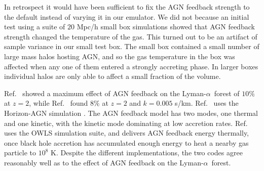 \documentclass[a4paper,11pt]{article}
\newcommand{\Lya}{Lyman-$\alpha$}
\begin{document}
In retrospect it would have been sufficient to fix the AGN feedback strength to the default instead of varying it in our emulator. We did not because an initial test using a suite of $20$ Mpc/h small box simulations showed that AGN feedback strength changed the temperature of the gas. This turned out to be an artifact of sample variance in our small test box. The small box contained a small number of large mass halos hosting AGN, and so the gas temperature in the box was affected when any one of them entered a strongly accreting phase. In larger boxes individual halos are only able to affect a small fraction of the volume.


Ref.~\cite{Viel:2013} showed a maximum effect of AGN feedback on the \Lya~forest of $10\%$ at $z=2$, while Ref.~\cite{Chabanier:2020} found $8\%$ at $z=2$ and $k = 0.005$ s/km. Ref.~\cite{Chabanier:2020} uses the Horizon-AGN simulation \cite{Dubois:2016}. The AGN feedback model has two modes, one thermal and one kinetic, with the kinetic mode dominating at low accretion rates. Ref.~\cite{Viel:2013} uses the OWLS simulation suite, and delivers AGN feedback energy thermally, once black hole accretion has accumulated enough energy to heat a nearby gas particle to $10^8$ K. Despite the different implementations, the two codes agree reasonably well as to the effect of AGN feedback on the \Lya~forest.

\end{document}
